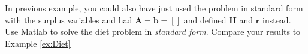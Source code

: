 \begin{exercise} In previous example, you could also have just used the problem in standard form with the surplus variables and had $\mathbf{A} = \mathbf{b} = []$ and defined $\mathbf{H}$ and $\mathbf{r}$ instead. Use Matlab to solve the diet problem in \textit{standard form}. Compare your results to Example \ref{ex:Diet}
\end{exercise}